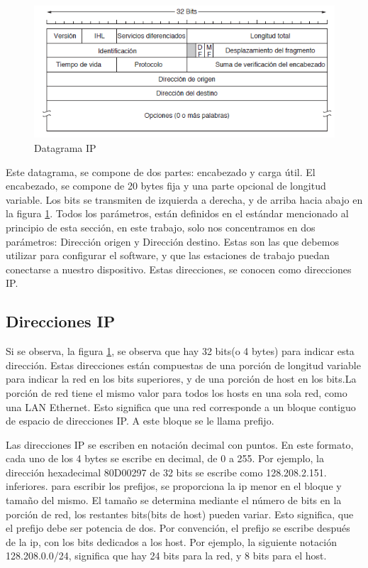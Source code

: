 \begin{figure}[ht]
	\centering
	\includegraphics{parte_2/redes/datagip}
	\caption{Datagrama IP}
	\label{fig:datIP}
\end{figure} 
Este datagrama, se compone de dos partes: encabezado y carga útil. El encabezado, se compone de 20 bytes fija y una parte opcional de longitud variable. Los bits se transmiten de izquierda a derecha, y de arriba hacia abajo en la figura \ref{fig:datIP}. Todos los parámetros, están definidos en el estándar mencionado al principio de esta sección, en este trabajo, solo nos concentramos en dos parámetros: Dirección origen y Dirección destino. Estas son las que debemos utilizar para configurar el software, y que las estaciones de trabajo puedan conectarse a nuestro dispositivo. Estas direcciones, se conocen como direcciones IP. 
\subsection{Direcciones IP} 
Si se observa, la figura \ref{fig:datIP}, se observa que hay 32 bits(o 4 bytes) para indicar esta dirección. Estas direcciones están compuestas de una porción de longitud variable para indicar la red en los bits superiores, y de una porción de host en los bits.La porción de red tiene el mismo valor para todos los hosts en una sola red, como una LAN Ethernet. Esto significa que una red corresponde a un bloque contiguo de espacio de direcciones IP. A este bloque se le llama prefijo. 

Las direcciones IP se escriben en notación decimal con puntos. En este formato, cada uno de los 4 bytes se escribe en decimal, de 0 a 255. Por ejemplo, la dirección hexadecimal 80D00297 de 32 bits se escribe como 128.208.2.151.  
inferiores. para escribir los prefijos, se proporciona la ip menor en el bloque y tamaño del mismo. El tamaño se determina mediante el número de bits en la porción de red, los restantes bits(bits de host) pueden variar. Esto significa, que el prefijo debe ser potencia de dos. Por convención, el prefijo se escribe después de la ip, con los bits dedicados a los host. Por ejemplo, la siguiente notación 128.208.0.0/24, significa que hay 24 bits para la red, y 8 bits para el host. 

